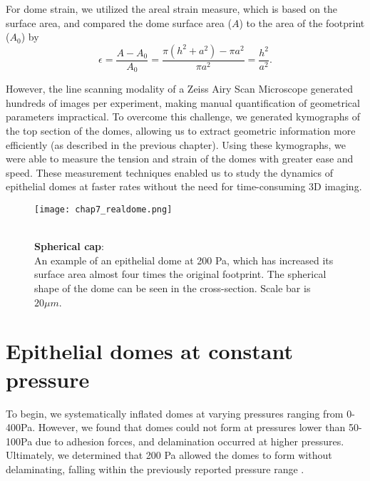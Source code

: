 For dome strain, we utilized the areal strain measure, which is based on the surface area, and compared the dome surface area ($A$) to the area of the footprint ($A_{0}$) by
\begin{equation}
	\label{eqn:arealstrain}
	\epsilon = \frac{A - A_{0}}{A_{0}} = \frac{\pi(h^2 + a^2) - \pi a^2}{\pi a^2} = \frac{h^2}{a^2} .
\end{equation}

However, the line scanning modality of a Zeiss Airy Scan Microscope generated hundreds of images per experiment, making manual quantification of geometrical parameters impractical. To overcome this challenge, we generated kymographs of the top section of the domes, allowing us to extract geometric information more efficiently (as described in the previous chapter). Using these kymographs, we were able to measure the tension and strain of the domes with greater ease and speed. These measurement techniques enabled us to study the dynamics of epithelial domes at faster rates without the need for time-consuming 3D imaging.

\begin{figure}
	\begin{minipage}[c]{0.7\textwidth}
		\texttt{[image: chap7\_realdome.png]}
	\end{minipage}\hfill
	\begin{minipage}[c]{0.27\textwidth}
		\caption{\\ \textbf{Spherical cap}:\\An example of an epithelial dome at 200 Pa, which has increased its surface area almost four times the original footprint. The spherical shape of the dome can be seen in the cross-section. Scale bar is  $20 \mu m$.
		} \label{fig_7_1}
	\end{minipage}
\end{figure}

\hypertarget{epithelial-domes-at-constant-pressure}{%
	\section{Epithelial domes at constant
		pressure}\label{epithelial-domes-at-constant-pressure}}

To begin, we systematically inflated domes at varying pressures ranging
from 0-400Pa. However, we found that domes could not form at pressures
lower than 50-100Pa due to adhesion forces, and delamination occurred at
higher pressures. Ultimately, we determined that 200 Pa allowed the
domes to form without delaminating, falling within the previously
reported pressure range \cite{choudhury2022,marin-llaurado2022}.

